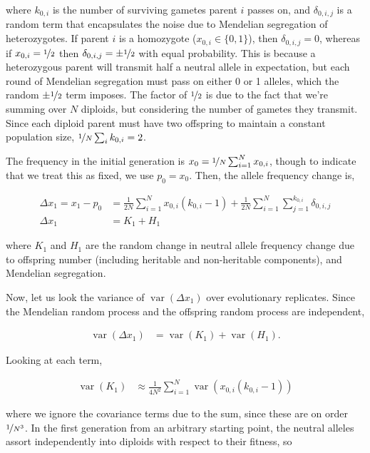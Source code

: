 \documentclass[11pt]{article}
\DeclareMathOperator{\var}{var}
\begin{document}
where $k_{0,i}$ is the number of surviving gametes parent $i$ passes on, and
$\delta_{0,i,j}$ is a random term that encapsulates the noise due to Mendelian
segregation of heterozygotes. If parent $i$ is a homozygote ($x_{0,i} \in \{0,
1\}$), then $\delta_{0,i,j} = 0$, whereas if $x_{0,i} = \nicefrac{1}{2}$ then
$\delta_{0,i,j} = \pm \nicefrac{1}{2}$ with equal probability. This is because
a heterozygous parent will transmit half a neutral allele in expectation, but
each round of Mendelian segregation must pass on either 0 or 1 alleles, which
the random $\pm \nicefrac{1}{2}$ term imposes. The factor of $\nicefrac{1}{2}$
is due to the fact that we're summing over $N$ diploids, but considering the
number of gametes they transmit. Since each diploid parent must have two
offspring to maintain a constant population size, $\nicefrac{1}{N} \sum_i
k_{0,i} = 2$. 

The frequency in the initial generation is $x_0 = \nicefrac{1}{N} \sum_{i=1}^N
x_{0,i}$, though to indicate that we treat this as fixed, we use $p_0 = x_0$.
Then, the allele frequency change is,

\begin{align}
  \Delta x_1 = x_1 - p_0 &= \frac{1}{2N} \sum_{i=1}^N x_{0,i} (k_{0,i} - 1) + \frac{1}{2N} \sum_{i=1}^N \sum_{j=1}^{k_{0,i}} \delta_{0,i,j} \\
  \Delta x_1 &= K_1 + H_1
\end{align}

where $K_1$ and $H_1$ are the random change in neutral allele frequency change
due to offspring number (including heritable and non-heritable components), and
Mendelian segregation.

Now, let us look the variance of $\var(\Delta x_1)$ over evolutionary
replicates. Since the Mendelian random process and the offspring random process
are independent,

\begin{align}
  \var(\Delta x_1) &= \var(K_1) + \var(H_1).
\end{align}

Looking at each term,

\begin{align}
  \var(K_1) &\approx \frac{1}{4N^2} \sum_{i=1}^N \var\left(x_{0,i} (k_{0,i} - 1) \right)
\end{align}

where we ignore the covariance terms due to the sum, since these are on order
$\nicefrac{1}{N^3}$. In the first generation from an arbitrary starting point,
the neutral alleles assort independently into diploids with respect to their
fitness, so
\end{document}
